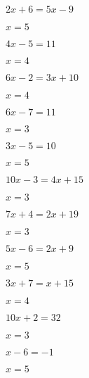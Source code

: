 \documentclass{ximera}
\begin{document}
\begin{exercise}
\begin{xmmulticols}
  \begin{question} \( 2x + 6  =  5x - 9     \) \begin{uitkomst} \( x  = 5  \) \end{uitkomst} \end{question}
  \begin{question} \( 4x - 5  =  11         \) \begin{uitkomst} \( x  = 4  \) \end{uitkomst} \end{question}
  \begin{question} \( 6x - 2  =  3x + 10    \) \begin{uitkomst} \( x  = 4  \) \end{uitkomst} \end{question}
  \begin{question} \( 6x - 7  =  11         \) \begin{uitkomst} \( x  = 3  \) \end{uitkomst} \end{question}
  \begin{question} \( 3x - 5  =  10         \) \begin{uitkomst} \( x  = 5  \) \end{uitkomst} \end{question}
  \begin{question} \( 10x - 3 =  4x + 15    \) \begin{uitkomst} \( x  = 3  \) \end{uitkomst} \end{question}
  \begin{question} \( 7x + 4  =  2x + 19    \) \begin{uitkomst} \( x  = 3  \) \end{uitkomst} \end{question}
  \begin{question} \( 5x - 6  =  2x + 9     \) \begin{uitkomst} \( x  = 5  \) \end{uitkomst} \end{question}
  \begin{question} \( 3x + 7  =  x + 15     \) \begin{uitkomst} \( x  = 4  \) \end{uitkomst} \end{question}
  \begin{question} \( 10x + 2 =  32         \) \begin{uitkomst} \( x  = 3  \) \end{uitkomst} \end{question}
  \begin{question} \( x - 6   =  -1         \) \begin{uitkomst} \( x  = 5  \) \end{uitkomst} \end{question}

\end{xmmulticols}
\end{exercise}
\end{document}
